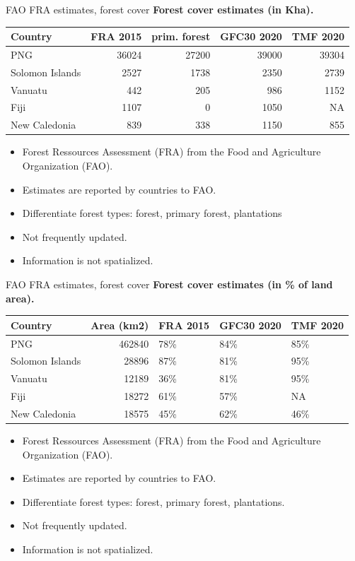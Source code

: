\documentclass[10pt,table,dvipsnames,compress]{beamer}
\begin{document}
\begin{frame}[label={sec:orgb02b39d}]{FAO FRA estimates, forest cover}
\textbf{Forest cover estimates (in Kha).}

\begin{center}
\footnotesize
\begin{tabular}{lrrrr}
Country & FRA 2015 & prim. forest & GFC30 2020 & TMF 2020\\[0pt]
\hline
PNG & 36024 & 27200 & 39000 & 39304\\[0pt]
Solomon Islands & 2527 & 1738 & 2350 & 2739\\[0pt]
Vanuatu & 442 & 205 & 986 & 1152\\[0pt]
Fiji & 1107 & 0 & 1050 & NA\\[0pt]
New Caledonia & 839 & 338 & 1150 & 855\\[0pt]
\end{tabular}
\end{center}

\begin{itemize}
\item Forest Ressources Assessment (FRA) from the Food and Agriculture Organization (FAO).
\item Estimates are reported by countries to FAO.
\item Differentiate forest types: forest, primary forest, plantations
\item Not frequently updated.
\item Information is not spatialized.
\end{itemize}
\end{frame}

\begin{frame}[label={sec:org0a93774}]{FAO FRA estimates, forest cover}
\textbf{Forest cover estimates (in \% of land area).}

\begin{center}
\footnotesize
\begin{tabular}{lrlll}
Country & Area (km2) & FRA 2015 & GFC30 2020 & TMF 2020\\[0pt]
\hline
PNG & 462840 & 78\% & 84\% & 85\%\\[0pt]
Solomon Islands & 28896 & 87\% & 81\% & 95\%\\[0pt]
Vanuatu & 12189 & 36\% & 81\% & 95\%\\[0pt]
Fiji & 18272 & 61\% & 57\% & NA\\[0pt]
New Caledonia & 18575 & 45\% & 62\% & 46\%\\[0pt]
\end{tabular}
\end{center}

\begin{itemize}
\item Forest Ressources Assessment (FRA) from the Food and Agriculture Organization (FAO).
\item Estimates are reported by countries to FAO.
\item Differentiate forest types: forest, primary forest, plantations.
\item Not frequently updated.
\item Information is not spatialized.
\end{itemize}
\end{frame}
\end{document}
